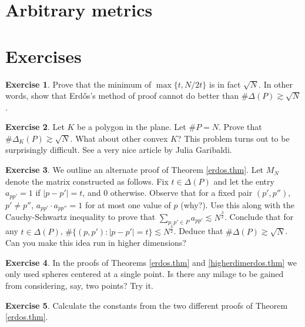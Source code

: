 \documentclass[]{stml-l}
\numberwithin{equation}{chapter}
\theoremstyle{plain}
\theoremstyle{definition}
\newtheorem{exercise}{Exercise}[chapter]
\theoremstyle{remark}
\begin{document}
\section{Arbitrary metrics}


\section*{Exercises}

\begin{exercise}  \label{ex1.1}
Prove that the minimum of $\max \{t, N/2t\}$ is in fact $\sqrt{N}$.  In other words, show that Erd\H{o}s's method of proof cannot do better than $\# \Delta(P) \gtrsim \sqrt{N}$. \end{exercise}

\begin{exercise} \label{ex1.2}
Let $K$ be a polygon in the plane. Let $\#
P=N$. Prove that $\# \Delta_K(P) \gtrsim \sqrt{N}$. What about
other convex $K$? This problem turns out to be surprisingly difficult.
See a very nice article by Julia Garibaldi. \end{exercise}

\begin{exercise} \label{ex1.3}
We outline an alternate proof of Theorem \ref{erdos.thm}. Let $M_N$ denote the matrix constructed as follows. Fix $t
\in \Delta(P)$ and let the entry $a_{pp'}=1$ if $|p-p'|=t$, and
$0$ otherwise. Observe that for a fixed pair $(p',p'')$, $p'
\not=p''$, $a_{pp'} \cdot a_{pp''}=1$ for at most one value of $p$
(why?). Use this along with the Cauchy-Schwartz inequality to
prove that $\sum_{p,p' \in P} a_{pp'} \lesssim N^{\frac{3}{2}}$.
Conclude that for any $t \in \Delta(P)$, $\# \{(p,p'): |p-p'|=t\}
\lesssim N^{\frac{3}{2}}$. Deduce that $\# \Delta(P) \gtrsim
\sqrt{N}$. Can you make this idea run in higher dimensions?
\end{exercise}

\begin{exercise} \label{ex1.4}
In the proofs of Theorems \ref{erdos.thm} and \ref{higherdimerdos.thm} we
only used spheres centered at a single point. Is there any milage
to be gained from considering, say, two points? Try it.
\end{exercise}

\begin{exercise} \label{ex1.5}
Calculate the constants from the two different proofs of Theorem \ref{erdos.thm}.  
\end{exercise}
\end{document}
